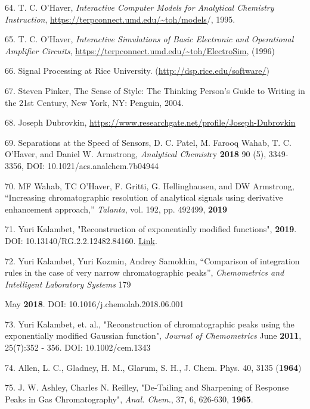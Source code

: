 64. T. C. O’Haver, \textit{Interactive Computer Models for Analytical Chemistry Instruction}, \href{https://terpconnect.umd.edu/~toh/models/RegressionDemo.xls}{https://terpconnect.umd.edu/\textasciitilde{}toh/models}/, 1995.

65. T. C. O’Haver, \textit{Interactive Simulations of Basic Electronic and Operational Amplifier Circuits}, \url{https://terpconnect.umd.edu/~toh/ElectroSim}, (1996)

66. Signal Processing at Rice University. (\url{http://dsp.rice.edu/software/})

67. Steven Pinker, The Sense of Style: The Thinking Person's Guide to Writing in the 21st Century, New York, NY: Penguin, 2004.

68. Joseph Dubrovkin, \url{https://www.researchgate.net/profile/Joseph-Dubrovkin}

69. Separations at the Speed of Sensors, D. C. Patel, M. Farooq Wahab, T. C. O’Haver, and Daniel W. Armstrong, \textit{Analytical Chemist}ry \textbf{2018} 90 (5), 3349-3356, DOI: 10.1021/acs.analchem.7b04944

70. MF Wahab, TC O'Haver, F. Gritti, G. Hellinghausen, and DW Armstrong, ``Increasing chromatographic resolution of analytical signals using derivative enhancement approach,'' \textit{Talanta}, vol. 192, pp. 492\textendash{}499, \textbf{2019}

71. Yuri Kalambet, "Reconstruction of exponentially modified functions", \textbf{2019}. DOI: 10.13140/RG.2.2.12482.84160. \href{https://www.researchgate.net/publication/333237821\_Reconstruction\_of\_exponentially\_modified\_functions}{Link}. 

72. Yuri Kalambet, Yuri Kozmin, Andrey Samokhin, ``Comparison of integration rules in the case of very narrow chromatographic peaks'', \textit{Chemometrics and Intelligent Laboratory Systems} 179

May \textbf{2018}. DOI: 10.1016/j.chemolab.2018.06.001

73. Yuri Kalambet, et. al., "Reconstruction of chromatographic peaks using the exponentially modified Gaussian function", \textit{Journal of Chemometrics} June \textbf{2011}, 25(7):352 - 356. DOI: 10.1002/cem.1343\label{ref-0534}\label{ref-0535}\label{ref-0536}

74. Allen, L. C., Gladney, H. M., Glarum, S. H., J. Chem. Phys. 40, 3135 (\textbf{1964})

75. J. W. Ashley, Charles N. Reilley, "De-Tailing and Sharpening of Response Peaks in Gas Chromatography", \textit{Anal. Chem.}, 37, 6, 626-630, \textbf{1965}.

